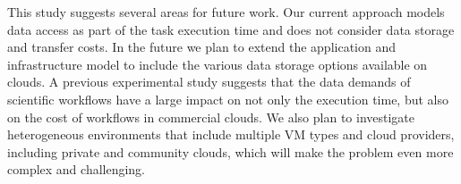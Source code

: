 \documentclass[conference]{IEEEtran}
\begin{document}

This study suggests several areas for future work. Our current approach models
data access as part of the task execution time and does not consider data
storage and transfer costs. In the future we plan to extend the application
and infrastructure model to  include the various data storage options
available on clouds. A previous experimental study \cite{Juve2010} suggests
that the data demands of scientific workflows have a large impact on not only
the execution time, but also on the cost of workflows in commercial clouds. We
also plan to investigate heterogeneous environments that include multiple VM
types and cloud providers, including private and community clouds, which will
make the problem even more complex and challenging.





%







\end{document}
